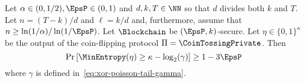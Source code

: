\begin{proposition}\label{prop:coin-tossing-security-private}
	Let $\alpha \in (0, 1/2), \EpsP \in (0, 1)$ and $d, k, T \in \NN$ 
	so that $d$ divides both $k$ and $T$. 
	Let $n = (T - k)/d$ and $\ell = k/d$ 
	and, furthermore, assume that $n \geq \ln(1/\alpha)/\ln(1/\EpsP)$.
	Let $\Blockchain$ be $(\EpsP, k)$-secure. 
	Let $\eta \in \{0,1\}^\kappa$ be the output of 
	the coin-flipping protocol $\Pi = \CoinTossingPrivate$. 
	Then 
	\begin{equation}
		\Pr\left[\MinEntropy(\eta) \geq \kappa - \log_2(\gamma) \right] \geq 1 - 3 \EpsP
	\end{equation}
	where $\gamma$ is defined in~\eqref{eq:xor-poisson-tail-gamma}.


\end{proposition}


